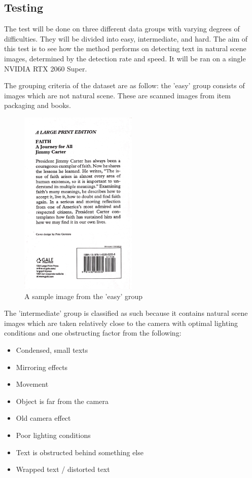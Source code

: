 \documentclass[10pt, a4paper]{article}
\begin{document}
\clearpage

\subsection{Testing} %
\label{sub:testing}
The test will be done on three different data groups with varying degrees of difficulties. They will be divided into easy, intermediate, and hard. The aim of this test is to see how the method performs on detecting text in natural scene images, determined by the detection rate and speed. It will be ran on a single NVIDIA RTX 2060 Super.

The grouping criteria of the dataset are as follow: the 'easy' group consists of images which are not natural scene. These are scanned images from item packaging and books.
\begin{figure}[hbt!]
	\centering
	\includegraphics[width=0.5\textwidth]{img/sampleeasy.JPG}
	\caption{A sample image from the 'easy' group}
	\label{fig:sampleeasy}
\end{figure}

The 'intermediate' group is classified as such because it contains natural scene images which are taken relatively close to the camera with optimal lighting conditions and one obstructing factor from the following:
\begin{itemize}
	\item Condensed, small texts
	\item Mirroring effects
	\item Movement
	\item Object is far from the camera
	\item Old camera effect
	\item Poor lighting conditions
	\item Text is obstructed behind something else
	\item Wrapped text / distorted text
\end{itemize}
\end{document}
